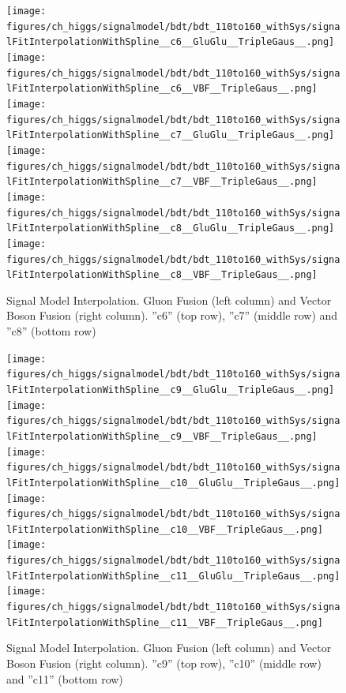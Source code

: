 \begin{figure}[htbp]
  \centering
  \texttt{[image: figures/ch\_higgs/signalmodel/bdt/bdt\_110to160\_withSys/signalFitInterpolationWithSpline\_\_c6\_\_GluGlu\_\_TripleGaus\_\_.png]}
  \texttt{[image: figures/ch\_higgs/signalmodel/bdt/bdt\_110to160\_withSys/signalFitInterpolationWithSpline\_\_c6\_\_VBF\_\_TripleGaus\_\_.png]}\\
  \texttt{[image: figures/ch\_higgs/signalmodel/bdt/bdt\_110to160\_withSys/signalFitInterpolationWithSpline\_\_c7\_\_GluGlu\_\_TripleGaus\_\_.png]}
  \texttt{[image: figures/ch\_higgs/signalmodel/bdt/bdt\_110to160\_withSys/signalFitInterpolationWithSpline\_\_c7\_\_VBF\_\_TripleGaus\_\_.png]}\\
  \texttt{[image: figures/ch\_higgs/signalmodel/bdt/bdt\_110to160\_withSys/signalFitInterpolationWithSpline\_\_c8\_\_GluGlu\_\_TripleGaus\_\_.png]}
  \texttt{[image: figures/ch\_higgs/signalmodel/bdt/bdt\_110to160\_withSys/signalFitInterpolationWithSpline\_\_c8\_\_VBF\_\_TripleGaus\_\_.png]}
  \caption{Signal Model Interpolation. Gluon Fusion (left column) and Vector Boson Fusion (right column). ''c6'' (top row), ''c7'' (middle row) and ''c8'' (bottom row)}
  \label{fig:higgs_signalmodel_gluvbfc3c5}
\end{figure}
\begin{figure}[htbp]
  \centering
  \texttt{[image: figures/ch\_higgs/signalmodel/bdt/bdt\_110to160\_withSys/signalFitInterpolationWithSpline\_\_c9\_\_GluGlu\_\_TripleGaus\_\_.png]}
  \texttt{[image: figures/ch\_higgs/signalmodel/bdt/bdt\_110to160\_withSys/signalFitInterpolationWithSpline\_\_c9\_\_VBF\_\_TripleGaus\_\_.png]}\\
  \texttt{[image: figures/ch\_higgs/signalmodel/bdt/bdt\_110to160\_withSys/signalFitInterpolationWithSpline\_\_c10\_\_GluGlu\_\_TripleGaus\_\_.png]}
  \texttt{[image: figures/ch\_higgs/signalmodel/bdt/bdt\_110to160\_withSys/signalFitInterpolationWithSpline\_\_c10\_\_VBF\_\_TripleGaus\_\_.png]}\\
  \texttt{[image: figures/ch\_higgs/signalmodel/bdt/bdt\_110to160\_withSys/signalFitInterpolationWithSpline\_\_c11\_\_GluGlu\_\_TripleGaus\_\_.png]}
  \texttt{[image: figures/ch\_higgs/signalmodel/bdt/bdt\_110to160\_withSys/signalFitInterpolationWithSpline\_\_c11\_\_VBF\_\_TripleGaus\_\_.png]}
  \caption{Signal Model Interpolation. Gluon Fusion (left column) and Vector Boson Fusion (right column). ''c9'' (top row), ''c10'' (middle row) and ''c11'' (bottom row)}
  \label{fig:higgs_signalmodel_gluvbfc3c5}
\end{figure}

